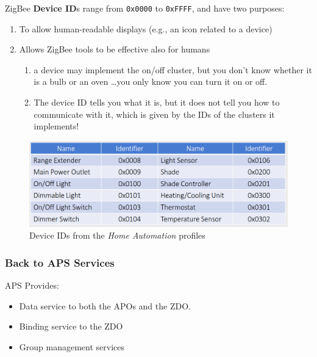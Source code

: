 \begin{paracol}{2}
   ZigBee \textbf{Device ID}s range from \texttt{0x0000} to \texttt{0xFFFF}, and have two purposes:
   \begin{enumerate}
      \item To allow human-readable displays (e.g., an icon related to a device)
      \item Allows ZigBee tools to be effective also for humans
      \begin{enumerate}
         \item a device may implement the on/off cluster, but you don’t know whether it is a bulb or an oven \dots you only know you can turn it on or off.
         \item The device ID tells you what it is, but it does not tell you how to communicate with it, which is given by the IDs of the clusters it implements!
      \end{enumerate}
   \end{enumerate}

   \switchcolumn

   \begin{figure}[htbp]
      \centering
      \includegraphics{images/zigbee_deviceIDs.png}
      \caption{Device IDs from the \textit{Home Automation} profiles}
      \label{fig:zigbee_deviceIDs}
   \end{figure}
\end{paracol}

\subsubsection{Back to APS Services}
APS Provides:
\begin{itemize}
   \item Data service to both the APOs and the ZDO.
   \item Binding service to the ZDO
   \item Group management services
\end{itemize}

